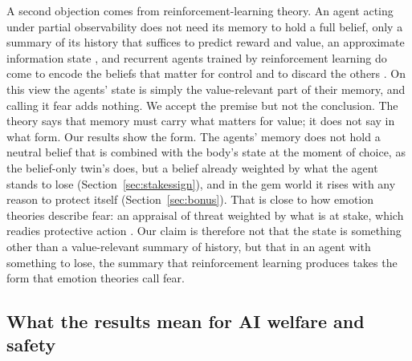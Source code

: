 \documentclass[11pt]{article}
\begin{document}
A second objection comes from reinforcement-learning theory. An agent acting under partial observability does not need its memory to hold a full belief, only a summary of its history that suffices to predict reward and value, an approximate information state \cite{subramanian2022ais}, and recurrent agents trained by reinforcement learning do come to encode the beliefs that matter for control and to discard the others \cite{lambrechts2022recurrent}. On this view the agents' state is simply the value-relevant part of their memory, and calling it fear adds nothing. We accept the premise but not the conclusion. The theory says that memory must carry what matters for value; it does not say in what form. Our results show the form. The agents' memory does not hold a neutral belief that is combined with the body's state at the moment of choice, as the belief-only twin's does, but a belief already weighted by what the agent stands to lose (Section~\ref{sec:stakessign}), and in the gem world it rises with any reason to protect itself (Section~\ref{sec:bonus}). That is close to how emotion theories describe fear: an appraisal of threat weighted by what is at stake, which readies protective action \cite{frijda1986emotions,ledoux2012rethinking}. Our claim is therefore not that the state is something other than a value-relevant summary of history, but that in an agent with something to lose, the summary that reinforcement learning produces takes the form that emotion theories call fear.

\subsection{What the results mean for AI welfare and safety}
\end{document}
